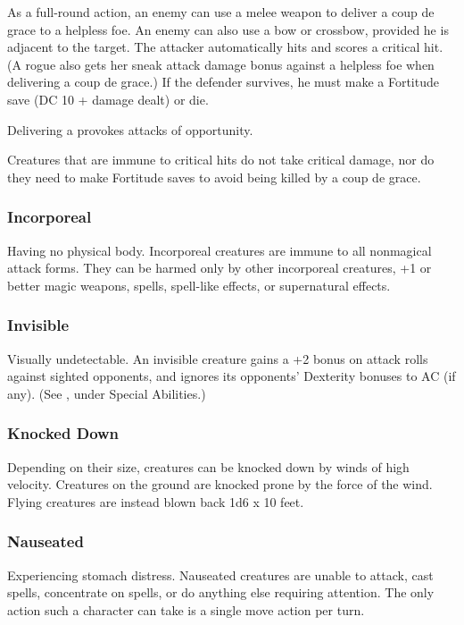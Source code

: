 As a full-round action, an enemy can use a melee weapon to deliver a coup de grace 
to a helpless foe. An enemy can also use a bow or crossbow, provided he is adjacent 
to the target. The attacker automatically hits and scores a critical hit. (A rogue 
also gets her sneak attack damage bonus against a helpless foe when delivering 
a coup de grace.) If the defender survives, he must make a Fortitude save (DC 10 
+ damage dealt) or die. 

Delivering a  provokes attacks of opportunity. 

Creatures that are immune to critical hits do not take critical damage, nor do 
they need to make Fortitude saves to avoid being killed by a coup de grace.

\subsubsection{Incorporeal}

Having no physical body. Incorporeal creatures are immune 
to all nonmagical attack forms. They can be harmed only by other incorporeal creatures, 
+1 or better magic weapons, spells, spell-like effects, or supernatural effects. 

\subsubsection{Invisible}

Visually undetectable. An invisible creature gains a +2 bonus 
on attack rolls against sighted opponents, and ignores its opponents' Dexterity 
bonuses to AC (if any). (See , under Special Abilities.)

\subsubsection{Knocked Down}

Depending on their size, creatures can be knocked down by 
winds of high velocity. Creatures on the ground are knocked prone by the force 
of the wind. Flying creatures are instead blown back 1d6 x 10 feet.

\subsubsection{Nauseated}

Experiencing stomach distress. Nauseated creatures are unable 
to attack, cast spells, concentrate on spells, or do anything else requiring attention. 
The only action such a character can take is a single move action per turn.

